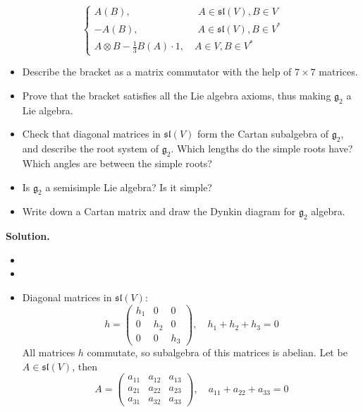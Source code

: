 \documentclass[12pt]{article}
\theoremstyle{definition}
\begin{document}
\begin{enumerate}
\begin{equation}
\begin{cases}
            A(B),\quad\quad\quad\quad\quad\quad\;\;\; A\in\mathfrak{sl}(V), B\in V\\
            -A(B),\quad\quad\quad\quad\quad\quad A\in\mathfrak{sl}(V), B\in V^*\\
            A\otimes B-\frac{1}{3}B(A)\cdot1,\quad A\in V,B\in V^*
        \end{cases}
    \end{equation}
    \begin{itemize}
        \item Describe the bracket as a matrix commutator with the help of $7\times7$ matrices.
        \item Prove that the bracket satisfies all the Lie algebra axioms, thus making $\mathfrak{g}_2$ a Lie algebra.
        \item Check that diagonal matrices in $\mathfrak{sl}(V)$ form the Cartan subalgebra of $\mathfrak{g}_2$, and describe the root system of $\mathfrak{g}_2$. Which lengths do the simple roots have? Which angles are between the simple roots?
        \item Is $\mathfrak{g}_2$ a semisimple Lie algebra? Is it simple?
        \item Write down a Cartan matrix and draw the Dynkin diagram for $\mathfrak{g}_2$ algebra.
    \end{itemize}
    \textbf{Solution.}
    \begin{itemize}
        \item 
        \item 
        \item Diagonal matrices in $\mathfrak{sl}(V)$:
        \begin{equation}
            h=\begin{pmatrix}
                h_1 & 0 & 0\\
                0 & h_2 & 0\\
                0 & 0 & h_3
            \end{pmatrix},\quad h_1+h_2+h_3=0
        \end{equation}
        All matrices $h$ commutate, so subalgebra of this matrices is abelian. Let be $A\in\mathfrak{sl}(V)$, then
        \begin{equation}
            A=\begin{pmatrix}
                a_{11} & a_{12} & a_{13}\\
                a_{21} & a_{22} & a_{23}\\
                a_{31} & a_{32} & a_{33}
            \end{pmatrix},\quad a_{11}+a_{22}+a_{33}=0

\end{equation}
\end{itemize}
\end{enumerate}
\end{document}
